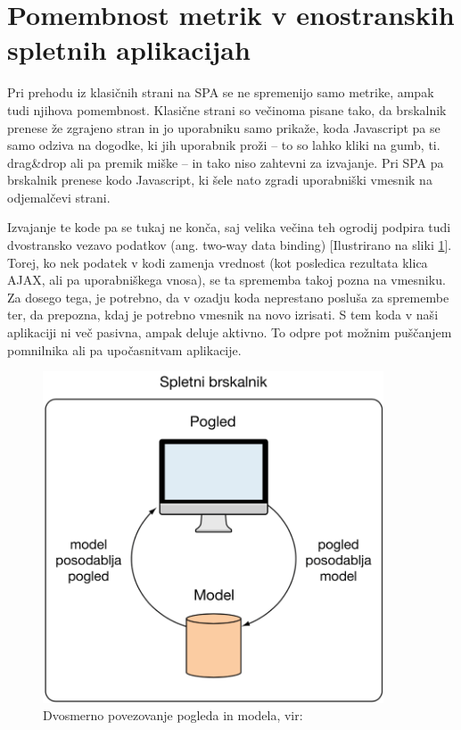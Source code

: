 \documentclass[a4paper, 12pt]{book}
\begin{document}
\section{Pomembnost metrik v enostranskih spletnih aplikacijah}
\label{ch1:sec1}

Pri prehodu iz klasičnih strani na SPA se ne spremenijo samo metrike, ampak tudi njihova pomembnost. Klasične strani so večinoma pisane tako, da brskalnik prenese že zgrajeno stran in jo uporabniku samo prikaže, koda Javascript pa se samo odziva na dogodke, ki jih uporabnik proži – to so lahko kliki na gumb, ti. drag\&drop ali pa premik miške – in tako niso zahtevni za izvajanje. Pri SPA pa brskalnik prenese kodo Javascript, ki šele nato zgradi uporabniški vmesnik na odjemalčevi strani.

Izvajanje te kode pa se tukaj ne konča, saj velika večina teh ogrodij podpira tudi dvostransko vezavo podatkov (ang. two-way data binding) [Ilustrirano na sliki \ref{img:angularjs_two_way_databind}]. Torej, ko nek podatek v kodi zamenja vrednost (kot posledica rezultata klica AJAX, ali pa uporabniškega vnosa), se ta sprememba takoj pozna na vmesniku. Za dosego tega, je potrebno, da v ozadju koda neprestano posluša za spremembe ter, da prepozna, kdaj je potrebno vmesnik na novo izrisati. S tem koda v naši aplikaciji ni več pasivna, ampak deluje aktivno. To odpre pot možnim puščanjem pomnilnika ali pa upočasnitvam aplikacije.

\begin{figure}[h]
	\begin{center}
		\includegraphics[width=0.9\textwidth]{AngularJS_dvosmerno_povezovanje.png}
	\end{center}
	\caption{Dvosmerno povezovanje pogleda in modela, vir: \cite{sp_skripta}}
	\label{img:angularjs_two_way_databind}
\end{figure}
\end{document}
